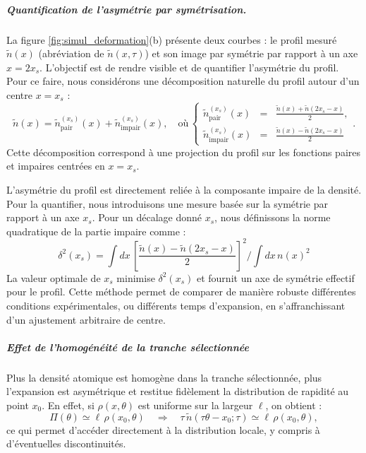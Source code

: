 \subparagraph{Quantification de l’asymétrie par symétrisation.}
La figure \ref{fig:simul_deformation}(b) présente deux courbes : le profil mesuré $\tilde{n}(x)$ (abréviation de $\tilde{n}(x,\tau)$) et son image par symétrie par rapport à un axe $x = 2x_s$. L’objectif est de rendre visible et de quantifier l’asymétrie du profil.
Pour ce faire, nous considérons une décomposition naturelle du profil autour d’un centre $x = x_s$ :
\begin{equation}
\tilde{n}(x) = \tilde{n}_{\text{pair}}^{(x_s)}(x) + \tilde{n}_{\text{impair}}^{(x_s)}(x),\quad \mbox{où} \, \left\{\begin{array}{lcr}\tilde{n}_{\text{pair}}^{(x_s)}(x) &=&  \displaystyle \frac{\tilde{n}(x) + \tilde{n}(2x_s - x)}{2} , \\ \tilde{n}_{\text{impair}}^{(x_s)}(x) &=& \displaystyle \frac{\tilde{n}(x) - \tilde{n}(2x_s - x) }{2}\end{array} \right. .
\end{equation}
Cette décomposition correspond à une projection du profil sur les fonctions paires et impaires centrées en $x = x_s$.

\medskip

L’asymétrie du profil est directement reliée à la composante impaire de la densité. Pour la quantifier, nous introduisons une mesure basée sur la symétrie par rapport à un axe $x_s$. Pour un décalage donné $x_s$, nous définissons la norme quadratique de la partie impaire comme :
\begin{equation}
\mathcal{\delta}^2(x_s) = \int dx\, \left[\frac{\tilde{n}(x) - \tilde{n}(2x_s - x)}{2}\right]^2 \Big / \int dx \,  n(x)^2
\end{equation}
La valeur optimale de $x_s$ minimise $\mathcal{\delta}^2(x_s)$ et fournit un axe de symétrie effectif pour le profil. Cette méthode permet de comparer de manière robuste différentes conditions expérimentales, ou différents temps d’expansion, en s’affranchissant d’un ajustement arbitraire de centre.


\subparagraph{Effet de l’homogénéité de la tranche sélectionnée}

Plus la densité atomique est homogène dans la tranche sélectionnée, plus l’expansion est asymétrique et restitue fidèlement la distribution de rapidité au point $x_0$. En effet, si $\rho(x,\theta)$ est uniforme sur la largeur $\ell$, on obtient :
\begin{equation}
\Pi(\theta) \simeq \ell\, \rho(x_0,\theta) \quad \Rightarrow \quad \tau\, \tilde{n}(\tau \theta - x_0 ; \tau) \simeq \ell\, \rho(x_0,\theta),
\end{equation}
ce qui permet d’accéder directement à la distribution locale, y compris à d’éventuelles discontinuités.

